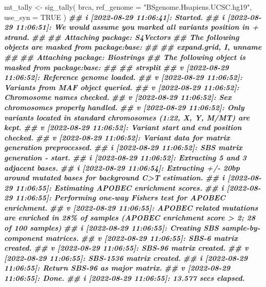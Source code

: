 \documentclass[
  12pt,
  a4paper,
  twoside]{book}
\newenvironment{Shaded}{\begin{snugshade}}{\end{snugshade}}
\newcommand{\AttributeTok}[1]{\textcolor[rgb]{0.77,0.63,0.00}{#1}}
\newcommand{\ConstantTok}[1]{\textcolor[rgb]{0.00,0.00,0.00}{#1}}
\newcommand{\DocumentationTok}[1]{\textcolor[rgb]{0.56,0.35,0.01}{\textbf{\textit{#1}}}}
\newcommand{\FunctionTok}[1]{\textcolor[rgb]{0.00,0.00,0.00}{#1}}
\newcommand{\NormalTok}[1]{#1}
\newcommand{\OtherTok}[1]{\textcolor[rgb]{0.56,0.35,0.01}{#1}}
\newcommand{\StringTok}[1]{\textcolor[rgb]{0.31,0.60,0.02}{#1}}
\begin{document}
\begin{Shaded}
\begin{Highlighting}[]
\NormalTok{mt\_tally }\OtherTok{\textless{}{-}} \FunctionTok{sig\_tally}\NormalTok{(}
\NormalTok{  brca,}
  \AttributeTok{ref\_genome =} \StringTok{"BSgenome.Hsapiens.UCSC.hg19"}\NormalTok{,}
  \AttributeTok{use\_syn =} \ConstantTok{TRUE}
\NormalTok{)}
\DocumentationTok{\#\# i [2022{-}08{-}29 11:06:41]: Started.}
\DocumentationTok{\#\# i [2022{-}08{-}29 11:06:51]: We would assume you marked all variants\textquotesingle{} position in + strand.}
\DocumentationTok{\#\# }
\DocumentationTok{\#\# Attaching package: \textquotesingle{}S4Vectors\textquotesingle{}}
\DocumentationTok{\#\# The following objects are masked from \textquotesingle{}package:base\textquotesingle{}:}
\DocumentationTok{\#\# }
\DocumentationTok{\#\#     expand.grid, I, unname}
\DocumentationTok{\#\# }
\DocumentationTok{\#\# Attaching package: \textquotesingle{}Biostrings\textquotesingle{}}
\DocumentationTok{\#\# The following object is masked from \textquotesingle{}package:base\textquotesingle{}:}
\DocumentationTok{\#\# }
\DocumentationTok{\#\#     strsplit}
\DocumentationTok{\#\# v [2022{-}08{-}29 11:06:52]: Reference genome loaded.}
\DocumentationTok{\#\# v [2022{-}08{-}29 11:06:52]: Variants from MAF object queried.}
\DocumentationTok{\#\# v [2022{-}08{-}29 11:06:52]: Chromosome names checked.}
\DocumentationTok{\#\# v [2022{-}08{-}29 11:06:52]: Sex chromosomes properly handled.}
\DocumentationTok{\#\# v [2022{-}08{-}29 11:06:52]: Only variants located in standard chromosomes (1:22, X, Y, M/MT) are kept.}
\DocumentationTok{\#\# v [2022{-}08{-}29 11:06:52]: Variant start and end position checked.}
\DocumentationTok{\#\# v [2022{-}08{-}29 11:06:52]: Variant data for matrix generation preprocessed.}
\DocumentationTok{\#\# i [2022{-}08{-}29 11:06:52]: SBS matrix generation {-} start.}
\DocumentationTok{\#\# i [2022{-}08{-}29 11:06:52]: Extracting 5\textquotesingle{} and 3\textquotesingle{} adjacent bases.}
\DocumentationTok{\#\# i [2022{-}08{-}29 11:06:54]: Extracting +/{-} 20bp around mutated bases for background C\textgreater{}T estimation.}
\DocumentationTok{\#\# i [2022{-}08{-}29 11:06:55]: Estimating APOBEC enrichment scores.}
\DocumentationTok{\#\# i [2022{-}08{-}29 11:06:55]: Performing one{-}way Fisher\textquotesingle{}s test for APOBEC enrichment.}
\DocumentationTok{\#\# v [2022{-}08{-}29 11:06:55]: APOBEC related mutations are enriched in 28\% of samples (APOBEC enrichment score \textgreater{} 2; 28 of 100 samples)}
\DocumentationTok{\#\# i [2022{-}08{-}29 11:06:55]: Creating SBS sample{-}by{-}component matrices.}
\DocumentationTok{\#\# v [2022{-}08{-}29 11:06:55]: SBS{-}6 matrix created.}
\DocumentationTok{\#\# v [2022{-}08{-}29 11:06:55]: SBS{-}96 matrix created.}
\DocumentationTok{\#\# v [2022{-}08{-}29 11:06:55]: SBS{-}1536 matrix created.}
\DocumentationTok{\#\# i [2022{-}08{-}29 11:06:55]: Return SBS{-}96 as major matrix.}
\DocumentationTok{\#\# v [2022{-}08{-}29 11:06:55]: Done.}
\DocumentationTok{\#\# i [2022{-}08{-}29 11:06:55]: 13.577 secs elapsed.}
\end{Highlighting}
\end{Shaded}
\end{document}
